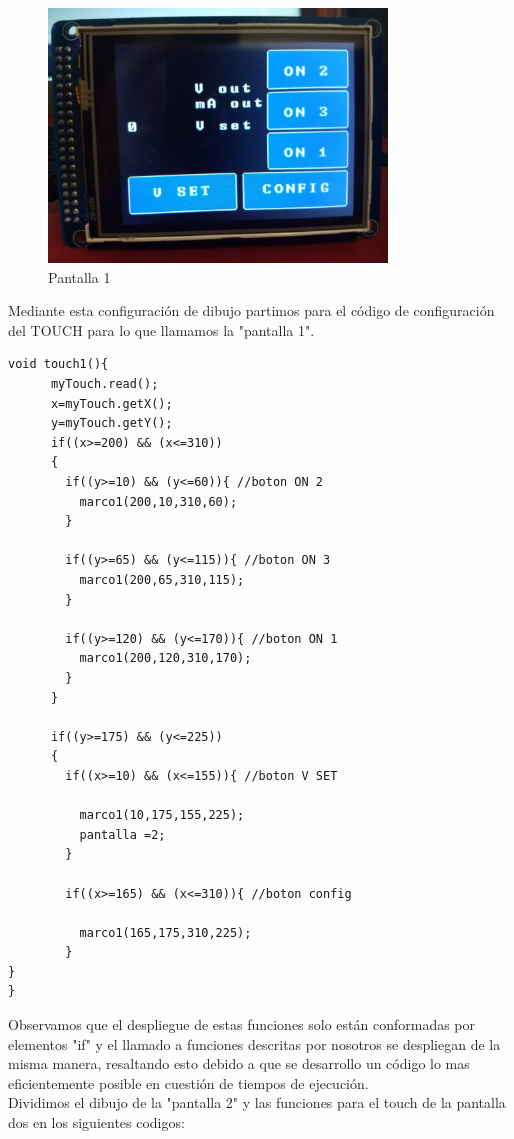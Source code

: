 \begin{figure}[H]
\centering
\includegraphics[width=9cm]{Capitulo3/figs/pantalla1.jpg}
\caption{Pantalla 1}
\end{figure}

Mediante esta configuración de dibujo partimos para el código de configuración del TOUCH para lo que llamamos la "pantalla 1".

\begin{verbatim}
void touch1(){ 
      myTouch.read();
      x=myTouch.getX();
      y=myTouch.getY();
      if((x>=200) && (x<=310))
      {
        if((y>=10) && (y<=60)){ //boton ON 2
          marco1(200,10,310,60);
        }
        
        if((y>=65) && (y<=115)){ //boton ON 3
          marco1(200,65,310,115);
        }
        
        if((y>=120) && (y<=170)){ //boton ON 1
          marco1(200,120,310,170);
        }
      }
      
      if((y>=175) && (y<=225))
      {
        if((x>=10) && (x<=155)){ //boton V SET
        
          marco1(10,175,155,225);
          pantalla =2;
        }
      
        if((x>=165) && (x<=310)){ //boton config
        
          marco1(165,175,310,225);
        }
}
}
\end{verbatim}

Observamos que el despliegue de estas funciones solo están conformadas por elementos "if" y el llamado a funciones descritas por nosotros se despliegan de la misma manera, resaltando esto debido a que se desarrollo un código lo mas eficientemente posible en cuestión de tiempos de ejecución. \\

Dividimos el dibujo de la "pantalla 2" y las funciones para el touch de la pantalla dos en los siguientes codigos:\\

